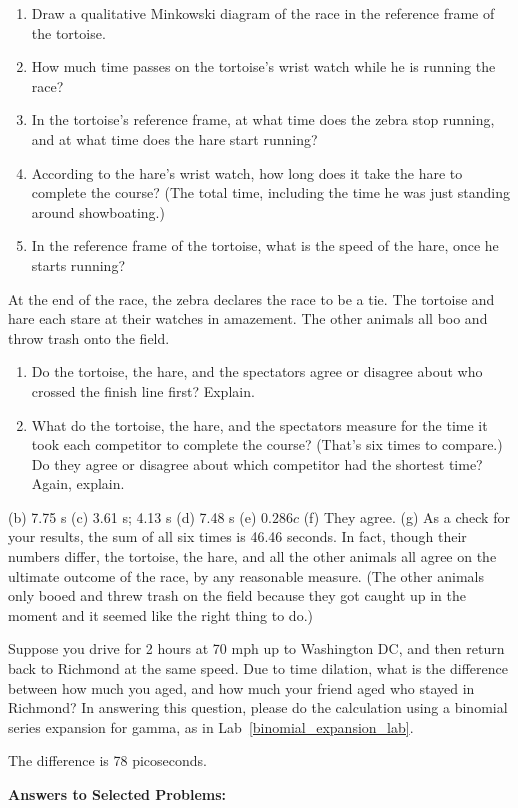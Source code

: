 \begin{Exercise}[difficulty=0]
\begin{minipage}{0.29 \textwidth}
\end{minipage}

\begin{enumerate}[nosep,label=(\alph*)]
\item Draw a qualitative Minkowski diagram of the race in the reference frame of the tortoise.
\item How much time passes on the tortoise's wrist watch while he is running the race?
\item In the tortoise's reference frame, at what time does the zebra stop running, and at what time does the hare start running?  
\item According to the hare's wrist watch, how long does it take the hare to complete the course?  (The total time, including the time he was just standing around showboating.)
\item In the reference frame of the tortoise, what is the speed of the hare, once he starts running?
\end{enumerate}
At the end of the race, the zebra declares the race to be a tie.  The tortoise and hare each stare at their watches in amazement.  The other animals all boo and throw trash onto the field.  
\begin{enumerate}[resume*]
\item Do the tortoise, the hare, and the spectators agree or disagree about who crossed the finish line first?  Explain.
\item What do the tortoise, the hare, and the spectators measure for the time it took each competitor to complete the course?  (That's six times to compare.)  Do they agree or disagree about which competitor had the shortest time?  Again, explain.
\end{enumerate}
\end{Exercise}
\begin{Answer}
(b) 7.75 s (c) 3.61 s; 4.13 s (d) 7.48 s (e) $0.286c$ (f) They agree.  (g) As a check for your results, the sum of all six times is 46.46 seconds.  In fact, though their numbers differ, the tortoise, the hare, and all the other animals all agree on the ultimate outcome of the race, by any reasonable measure.  (The other animals only booed and threw trash on the field because they got caught up in the moment and it seemed like the right thing to do.)
\end{Answer}

\begin{Exercise}[difficulty=0]
Suppose you drive for 2 hours at 70 mph up to Washington DC, and then return back to Richmond at the same speed.  Due to time dilation, what is the difference between how much you aged, and how much your friend aged who stayed in Richmond? In answering this question, please do the calculation using a binomial series expansion for gamma, as in Lab~\ref{binomial_expansion_lab}.

\end{Exercise}
\begin{Answer}
The difference is 78 picoseconds.
\end{Answer}


\bigskip\bigskip
\pagebreak[3]
\textbf{Answers to Selected {\thesubsection} Problems:}
\label{lorentz_prob_answers}
\shipoutAnswer

\cleardoublepage
